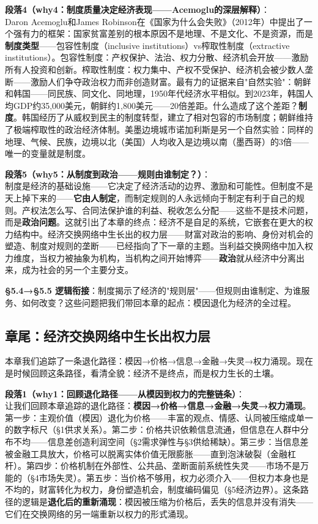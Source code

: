 \documentclass[../main.tex]{subfiles}
\begin{document}
	\textbf{段落4（why4：制度质量决定经济表现——Acemoglu的深层解释）}：\\
	Daron Acemoglu和James Robinson在《国家为什么会失败》（2012年）中提出了一个强有力的框架：国家贫富差别的根本原因不是地理、不是文化、不是资源，而是\textbf{制度类型}——包容性制度（inclusive institutions）vs榨取性制度（extractive institutions）。包容性制度：产权保护、法治、权力分散、经济机会开放——激励所有人投资和创新。榨取性制度：权力集中、产权不受保护、经济机会被少数人垄断——激励人们争夺政治权力而非创造财富。最有力的证据来自"自然实验"：朝鲜和韩国——同民族、同文化、同地理，1950年代经济水平相似。到2023年，韩国人均GDP约35,000美元，朝鲜约1,800美元——20倍差距。什么造成了这个差距？\textbf{制度}。韩国经历了从威权到民主的制度转型，建立了相对包容的市场制度；朝鲜维持了极端榨取性的政治经济体制。美墨边境城市诺加利斯是另一个自然实验：同样的地理、气候、民族，边境以北（美国）人均收入是边境以南（墨西哥）的3倍——唯一的变量就是制度。

	\textbf{段落5（why5：从制度到政治——规则由谁制定？）}：\\
	制度是经济的基础设施——它决定了经济活动的边界、激励和可能性。但制度不是天上掉下来的——\textbf{它由人制定}，而制定规则的人永远倾向于制定有利于自己的规则。产权法怎么写、合同法保护谁的利益、税收怎么分配——这些不是技术问题，而是\textbf{政治问题}。这就引出了本章的终点：经济不是自足的系统，它嵌套在更大的权力结构中。经济交换网络中生长出的权力层——财富对政治的影响、身份对机会的塑造、制度对规则的垄断——已经指向了下一章的主题。当利益交换网络中加入权力维度，当权力被抽象为机构，当机构之间开始博弈——\textbf{政治}就从经济中分离出来，成为社会的另一个主要分支。

	\textbf{§5.4→§5.5 逻辑衔接}：制度揭示了经济的"规则层"——但规则由谁制定、为谁服务、如何改变？这些问题把我们带回本章的起点：模因退化为经济的全过程。

	\subsection{章尾：经济交换网络中生长出权力层}
	\begin{motivation}
		本章我们追踪了一条退化路径：模因→价格→信息→金融→失灵→权力涌现。现在是时候回顾这条路径，看清全貌：经济不是终点，而是权力生长的土壤。
	\end{motivation}

	\textbf{段落1（why1：回顾退化路径——从模因到权力的完整链条）}：\\
	让我们回顾本章追踪的退化路径：\textbf{模因→价格→信息→金融→失灵→权力涌现}。第一步：主观价值（模因）退化为价格——丰富的观点、情感、认同被压缩成单一的数字标尺（§1供求关系）。第二步：价格共识依赖信息流通，但信息在人群中分布不均——信息差创造利润空间（§2需求弹性与§3供给稀缺）。第三步：当信息差被金融工具放大，价格可以脱离实体价值无限膨胀——直到泡沫破裂（金融杠杆）。第四步：价格机制在外部性、公共品、垄断面前系统性失灵——市场不是万能的（§4市场失灵）。第五步：当价格不够用，权力必须介入——但权力本身也是不均的，财富转化为权力，身份塑造机会，制度编码偏见（§5经济边界）。这条路径的逻辑是\textbf{退化后的重新涌现}：模因被压缩为价格后，丢失的信息并没有消失——它们在交换网络的另一端重新以权力的形式涌现。
\end{document}
